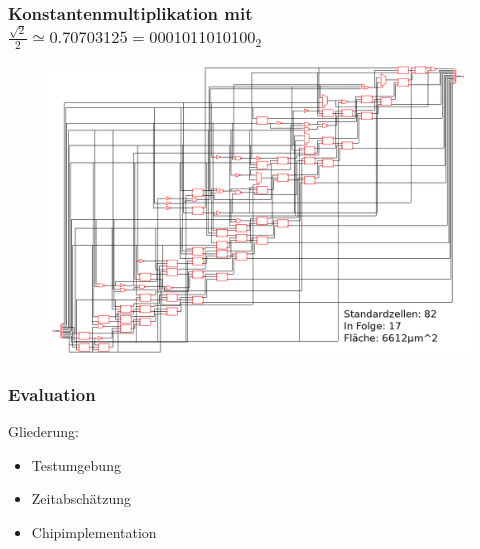 \begin{frame}\frametitle{Konstantenmultiplikation mit $\frac{\sqrt{2}}{2} \simeq 0.70703125 = 0001011010100_2$}
 \begin{figure}[!ht]
\centering  
  \includegraphics[width=1\textwidth]{img/13Bit_Konstantenmultiplizierer_neu.png}
\end{figure}
\end{frame}







\begin{frame}\frametitle{Evaluation}
Gliederung:
 \begin{itemize}
  \item Testumgebung
  \item Zeitabschätzung
  \item Chipimplementation
 \end{itemize}

\end{frame}


